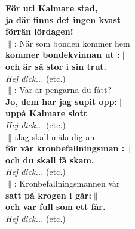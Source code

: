 \documentclass[a6paper, 10pt, twoside]{article}
\begin{document}
\textbf{För uti Kalmare stad,\\ ja där finns det ingen kvast\\ förrän lördagen!}
\vspace{5pt} \\
$\|$: När som bonden kommer hem \\
\textbf{kommer bondekvinnan ut :$\|$ \\och är så stor i sin trut.}
\vspace{5pt} \\
\textit{Hej dick...} (etc.) 
\vspace{5pt} \\
$\|$: Var är pengarna du fått?\\
\textbf{Jo, dem har jag supit opp:$\|$ \\uppå Kalmare slott}
\vspace{5pt} \\
\textit{Hej dick...} (etc.)
\vspace{5pt} \\
$\|$:Jag skall mäla dig an\\
\textbf{för vår kronbefallningsman :$\|$ \\ och du skall få skam.}
\noindent
\vspace{5pt} \\
\textit{Hej dick...} (etc.)
\vspace{5pt} \\
$\|$: Kronbefallningsmannen vår \\
\textbf{satt på krogen i går:$\|$\\ och var full som ett får.}
\vspace{5pt} \\
\textit{Hej dick...} (etc.)
%
\end{document}
